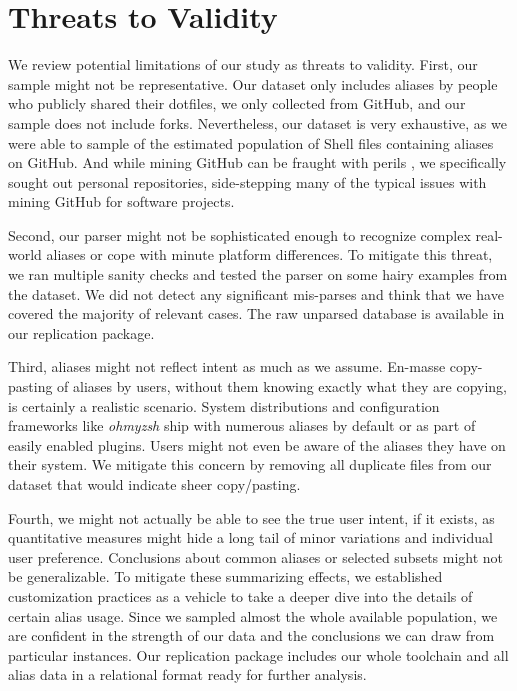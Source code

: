 \section{Threats to Validity}

We review potential limitations of our study as threats to validity.
First, our sample might not be representative.
Our dataset only includes aliases by people who publicly shared their dotfiles, we only collected from GitHub, and our sample does not include forks.
Nevertheless, our dataset is very exhaustive, as we were able to sample  of the estimated population of Shell files containing aliases on GitHub.
And while mining GitHub can be fraught with perils \citep{kalliamvakou:14}, we specifically sought out personal repositories, side-stepping many of the typical issues with mining GitHub for software projects.

Second, our parser might not be sophisticated enough to recognize complex real-world aliases or cope with minute platform differences.
To mitigate this threat, we ran multiple sanity checks and tested the parser on some hairy examples from the dataset.
We did not detect any significant mis-parses and think that we have covered the majority of relevant cases.
The raw unparsed database is available in our replication package.

Third, aliases might not reflect intent as much as we assume.
En-masse copy-pasting of aliases by users, without them knowing exactly what they are copying, is certainly a realistic scenario.
System distributions and configuration frameworks like \emph{ohmyzsh} ship with numerous aliases by default or as part of easily enabled plugins.
Users might not even be aware of the aliases they have on their system.
We mitigate this concern by removing all duplicate files from our dataset that would indicate sheer copy/pasting.

Fourth, we might not actually be able to see the true user intent, if it exists, as quantitative measures might hide a long tail of minor variations and individual user preference.
Conclusions about common aliases or selected subsets might not be generalizable.
To mitigate these summarizing effects, we established customization practices as a vehicle to take a deeper dive into the details of certain alias usage.
Since we sampled almost the whole available population, we are confident in the strength of our data and the conclusions we can draw from particular instances.
Our replication package includes our whole toolchain and all alias data in a relational format ready for further analysis.
